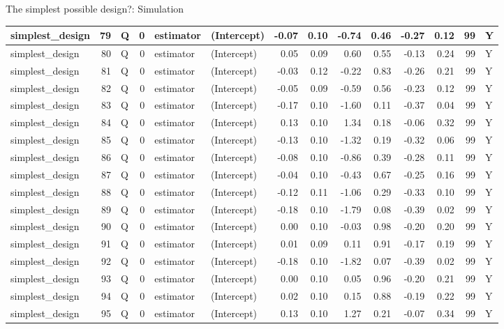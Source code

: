 \documentclass[
  11pt,
  ignorenonframetext,
]{beamer}
\begin{document}
\begin{frame}[fragile]{The simplest possible design?: Simulation}
\begin{tabular}{l|r|l|r|l|l|r|r|r|r|r|r|r|l}
\hline
simplest\_design & 79 & Q & 0 & estimator & (Intercept) & -0.07 & 0.10 & -0.74 & 0.46 & -0.27 & 0.12 & 99 & Y\\
\hline
simplest\_design & 80 & Q & 0 & estimator & (Intercept) & 0.05 & 0.09 & 0.60 & 0.55 & -0.13 & 0.24 & 99 & Y\\
\hline
simplest\_design & 81 & Q & 0 & estimator & (Intercept) & -0.03 & 0.12 & -0.22 & 0.83 & -0.26 & 0.21 & 99 & Y\\
\hline
simplest\_design & 82 & Q & 0 & estimator & (Intercept) & -0.05 & 0.09 & -0.59 & 0.56 & -0.23 & 0.12 & 99 & Y\\
\hline
simplest\_design & 83 & Q & 0 & estimator & (Intercept) & -0.17 & 0.10 & -1.60 & 0.11 & -0.37 & 0.04 & 99 & Y\\
\hline
simplest\_design & 84 & Q & 0 & estimator & (Intercept) & 0.13 & 0.10 & 1.34 & 0.18 & -0.06 & 0.32 & 99 & Y\\
\hline
simplest\_design & 85 & Q & 0 & estimator & (Intercept) & -0.13 & 0.10 & -1.32 & 0.19 & -0.32 & 0.06 & 99 & Y\\
\hline
simplest\_design & 86 & Q & 0 & estimator & (Intercept) & -0.08 & 0.10 & -0.86 & 0.39 & -0.28 & 0.11 & 99 & Y\\
\hline
simplest\_design & 87 & Q & 0 & estimator & (Intercept) & -0.04 & 0.10 & -0.43 & 0.67 & -0.25 & 0.16 & 99 & Y\\
\hline
simplest\_design & 88 & Q & 0 & estimator & (Intercept) & -0.12 & 0.11 & -1.06 & 0.29 & -0.33 & 0.10 & 99 & Y\\
\hline
simplest\_design & 89 & Q & 0 & estimator & (Intercept) & -0.18 & 0.10 & -1.79 & 0.08 & -0.39 & 0.02 & 99 & Y\\
\hline
simplest\_design & 90 & Q & 0 & estimator & (Intercept) & 0.00 & 0.10 & -0.03 & 0.98 & -0.20 & 0.20 & 99 & Y\\
\hline
simplest\_design & 91 & Q & 0 & estimator & (Intercept) & 0.01 & 0.09 & 0.11 & 0.91 & -0.17 & 0.19 & 99 & Y\\
\hline
simplest\_design & 92 & Q & 0 & estimator & (Intercept) & -0.18 & 0.10 & -1.82 & 0.07 & -0.39 & 0.02 & 99 & Y\\
\hline
simplest\_design & 93 & Q & 0 & estimator & (Intercept) & 0.00 & 0.10 & 0.05 & 0.96 & -0.20 & 0.21 & 99 & Y\\
\hline
simplest\_design & 94 & Q & 0 & estimator & (Intercept) & 0.02 & 0.10 & 0.15 & 0.88 & -0.19 & 0.22 & 99 & Y\\
\hline
simplest\_design & 95 & Q & 0 & estimator & (Intercept) & 0.13 & 0.10 & 1.27 & 0.21 & -0.07 & 0.34 & 99 & Y\\

\end{tabular}
\end{frame}
\end{document}

